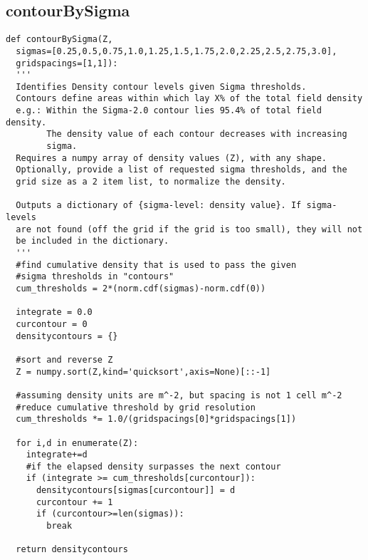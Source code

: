 \documentclass[12pt,letter]{article}
\begin{document}
\subsection{contourBySigma}
\begin{verbatim}
def contourBySigma(Z, 
  sigmas=[0.25,0.5,0.75,1.0,1.25,1.5,1.75,2.0,2.25,2.5,2.75,3.0],
  gridspacings=[1,1]):
  '''
  Identifies Density contour levels given Sigma thresholds.
  Contours define areas within which lay X% of the total field density
  e.g.: Within the Sigma-2.0 contour lies 95.4% of total field density.
        The density value of each contour decreases with increasing
        sigma.
  Requires a numpy array of density values (Z), with any shape.
  Optionally, provide a list of requested sigma thresholds, and the
  grid size as a 2 item list, to normalize the density.
  
  Outputs a dictionary of {sigma-level: density value}. If sigma-levels
  are not found (off the grid if the grid is too small), they will not
  be included in the dictionary.
  '''
  #find cumulative density that is used to pass the given
  #sigma thresholds in "contours"
  cum_thresholds = 2*(norm.cdf(sigmas)-norm.cdf(0))
  
  integrate = 0.0
  curcontour = 0
  densitycontours = {}
  
  #sort and reverse Z
  Z = numpy.sort(Z,kind='quicksort',axis=None)[::-1]
  
  #assuming density units are m^-2, but spacing is not 1 cell m^-2
  #reduce cumulative threshold by grid resolution
  cum_thresholds *= 1.0/(gridspacings[0]*gridspacings[1])
  
  for i,d in enumerate(Z):
    integrate+=d
    #if the elapsed density surpasses the next contour
    if (integrate >= cum_thresholds[curcontour]):
      densitycontours[sigmas[curcontour]] = d
      curcontour += 1
      if (curcontour>=len(sigmas)):
        break
  
  return densitycontours
\end{verbatim}
\end{document}
